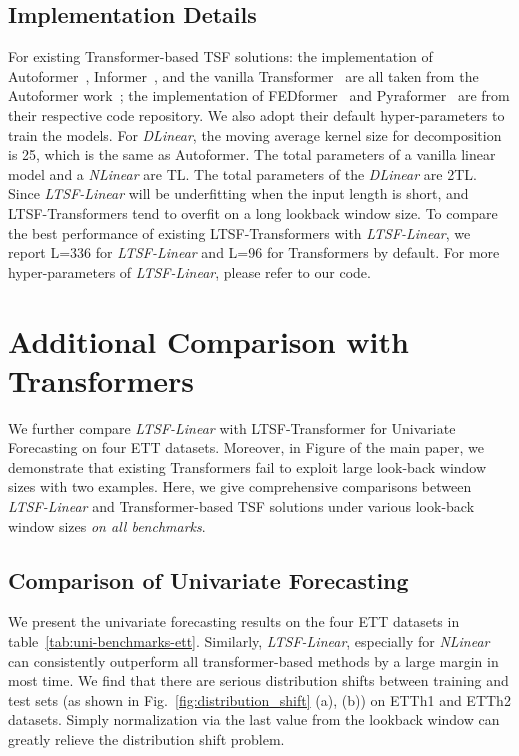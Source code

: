 \documentclass[10pt,twocolumn,letterpaper]{article}
\newcommand{\modelname}{\emph{LTSF-Linear}\xspace}
\begin{document}
\subsection{Implementation Details}
For existing Transformer-based TSF solutions: the implementation of Autoformer~\cite{xu2021autoformer}, Informer~\cite{informer}, and the vanilla Transformer~\cite{vaswani2017attention} are all taken from the Autoformer work~\cite{xu2021autoformer}; the implementation of FEDformer~\cite{zhou2022fedformer} and Pyraformer~\cite{liu2021pyraformer} are from their respective code repository. We also adopt their default hyper-parameters to train the models. For \emph{DLinear}, the moving average kernel size for decomposition is 25, which is the same as Autoformer. The total parameters of a vanilla linear model and a \emph{NLinear} are T\*L. The total parameters of the \emph{DLinear} are 2\*T\*L. Since \modelname will be underfitting when the input length is short, and LTSF-Transformers tend to overfit on a long lookback window size. To compare the best performance of existing LTSF-Transformers with \modelname, we report L=336 for \modelname and L=96 for Transformers by default. For more hyper-parameters of \modelname, please refer to our code.



\section{Additional Comparison with Transformers}
\label{sec:supp_add}
We further compare \modelname with LTSF-Transformer for  Univariate Forecasting on four ETT datasets. Moreover, in Figure  of the main paper, we demonstrate that existing Transformers fail to exploit large look-back window sizes with two examples. Here, we give comprehensive comparisons between \modelname and Transformer-based TSF solutions under various look-back window sizes \emph{on all benchmarks}.




\subsection{Comparison of Univariate Forecasting}

We present the univariate forecasting results on the four ETT datasets in table~\ref{tab:uni-benchmarks-ett}. Similarly, \modelname, especially for \emph{NLinear} can consistently outperform all transformer-based methods by a large margin in most time. We find that there are serious distribution shifts between training and test sets (as shown in Fig.~\ref{fig:distribution_shift} (a), (b)) on ETTh1 and ETTh2 datasets. Simply normalization via the last value from the lookback window can greatly relieve the distribution shift problem.
\end{document}
